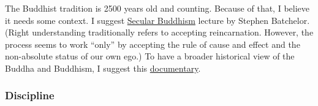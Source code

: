 \documentclass{article}
\begin{document}
The Buddhist tradition is 2500 years old and counting. Because of that, I believe it needs some context. I suggest \href{https://www.youtube.com/watch?v=Hhlj_SU9SAE}{Secular Buddhism} lecture by Stephen Batchelor.
(Right understanding traditionally refers to accepting reincarnation. However, the process seems to work ``only'' by accepting the rule of cause and effect and the non-absolute status of our own ego.)
To have a broader historical view of the Buddha and Buddhism, I suggest this \href{https://www.youtube.com/watch?v=ulSlL3ubJ3c}{documentary}.

\iffalse
\begin{minipage}[t]{0.45\textwidth}

...

\end{minipage}
\hfill
\begin{minipage}[t]{0.45\textwidth}

...

\end{minipage}
\fi


\subsubsection{Discipline}
\end{document}
